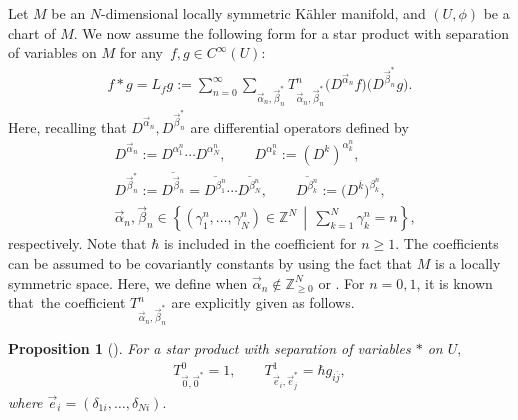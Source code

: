\documentclass[10pt,a4paper]{amsart}
\numberwithin{equation}{section}
\newtheorem{Proposition}[Theorem]{Proposition}
 { \theoremstyle{definition}
\newtheorem{Definition}[Theorem]{Definition}
\newtheorem{Note}[Theorem]{Note}
\newtheorem{Example}[Theorem]{Example}
\newtheorem{Remark}[Theorem]{Remark} }
\begin{document}
Let $M$ be an $N$-dimensional locally symmetric K\"ahler manifold, and $(U,\phi)$ be a chart of $M$. We now assume the following form for a star product with separation of variables on $M$ for any~${ f,g \in C^{\infty} ( U )}$:
\begin{align}
 f\ast g
 =
 L_{f}g
 :=
 \sum_{n=0}^{\infty}
 \sum_{
 \vec{\alpha}_{n},
 \vec{\beta}_{n}^{\ast}
 }
 T_{\vec{\alpha}_{n},\vec{\beta}_{n}^{\ast}}^{n}
 \bigl(
 D^{\vec{\alpha}_{n}}f
 \bigr)
 \bigl(
 D^{\vec{\beta}_{n}^{\ast}}g
 \bigr).
 \label{star_expand}
\end{align}
Here, recalling that
$
 D^{\vec{\alpha}_{n}},
 D^{\vec{\beta}_{n}^{\ast}}
$
are differential operators defined by
\begin{align*}
 &
 D^{\vec{\alpha}_{n}}
 :=
 D^{\alpha_{1}^{n}}\cdots D^{\alpha_{N}^{n}},
 \qquad
 D^{\alpha_{k}^{n}}
 :=
 (
 D^{k}
 )^{\alpha_{k}^{n}},
 \\
 &
 D^{\vec{\beta}_{n}^{\ast}}
 :=
 \overline{
 D^{\vec{\beta}_{n}}
 }
 =
 \overline{D^{\beta_{1}^{n}}}
 \cdots
 \overline{D^{\beta_{N}^{n}}},
 \qquad
 \overline{D^{\beta_{k}^{n}}}
 :=
 \bigl(
 D^{\overline{k}}
 \bigr)^{\beta_{k}^{n}},
 \\
 &
 \vec{\alpha}_{n},
 \vec{\beta}_{n}
 \in
 \left\{
 (\gamma_{1}^{n},\dots,\gamma_{N}^{n} )
 \in
 \mathbb{Z}^{N}
 \,\middle|\,
 \sum_{k=1}^{N}
 \gamma_{k}^{n}
 =
 n
 \right\},
\end{align*}
respectively.
Note that $\hbar$ is included in the coefficient  for $n\geq1$. The coefficients
can be assumed to be covariantly constants by using the fact that $M$ is a locally symmetric space. Here, we define
when
$
 \vec{\alpha}_{n}
 \notin
 \mathbb{Z}_{\geq0}^{N}
$
or
.
For $n=0,1$, it is known that~the coefficient
$
 T_{\vec{\alpha}_{n},\vec{\beta}_{n}^{\ast}}^{n}
$
are explicitly given as follows.

\begin{Proposition}[\cite{HS1,HS2}]\label{prop:covar_const_0and1}
 For a star product with separation of variables $\ast$ on $U,$
 \begin{align}
 T_{\vec{0},\vec{0}^{\ast}}^{0}
 =
 1,
 \qquad
 T_{\vec{e}_{i},\vec{e}_{j}^{\ast}}^{1}
 =
 \hbar
 g_{i\overline{j}},
 \label{init_cond_01}
 \end{align}
 \noindent
 where
 $
 \vec{e}_{i}
 =
 (\delta_{1i},\dots,\delta_{Ni} ).
 $
\end{Proposition}
\end{document}
